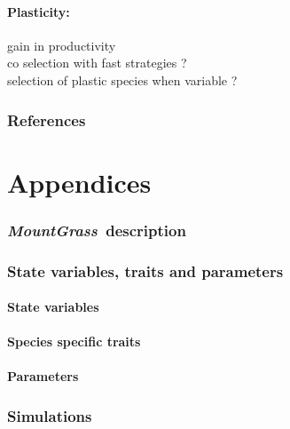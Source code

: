 \documentclass[review]{elsarticle}
\newcommand{\model}{\textbf{\textit{MountGrass}}~}
\begin{document}
\subsection{Plasticity: }
gain in productivity\\
co selection with fast strategies ?\\
selection of plastic species when variable ?


\section*{References}
\cite{Dirac1953888}


\part*{Appendices}


\section{\model description}

\section{State variables, traits and parameters}
\subsection{State variables}
\subsection{Species specific traits}
\subsection{Parameters}

\section{Simulations}
\end{document}
